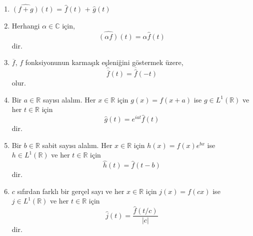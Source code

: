 \documentclass[a4paper, 9pt]{article}
\begin{document}
\begin{enumerate}
\item $\widehat{(f+g)}(t)$ = $\widehat{f}(t)$ + $\widehat{g}(t)$ 
\item Herhangi $\alpha \in \mathbb{C}$ için,
\[ \widehat{(\alpha f)}(t) = \alpha \widehat{f}(t) \]
dir.
\item  $\overline{f}$, $f$ fonksiyonunun karmaşık eşleniğini göstermek üzere,
\[ \widehat{\overline{f}}(t) = \overline{\widehat{f}}(-t) \]
olur.
\item  Bir $a \in \mathbb{R}$  sayısı alalım. Her $x\in \mathbb{R}$  için $g(x)=f(x+a)$ ise $g\in L^1(\mathbb{R})$ ve her $t\in \mathbb{R}$ için 
\[ \widehat{g}(t) = e^{iat}\widehat{f}(t)\]
dir.
\item Bir $b\in \mathbb{R}$ sabit sayısı alalım. Her $x\in \mathbb{R}$ için $h(x)=f(x)e^{bx}$ ise $h\in L^1(\mathbb{R})$ ve her $t\in \mathbb{R}$ için
\[ \widehat{h}(t) = \widehat{f}(t-b) \]
dir.
\item $c$ sıfırdan farklı bir gerçel sayı ve her $x \in \mathbb{R}$ için $j(x)=f(cx)$ ise $j\in L^1(\mathbb{R})$ ve her $t\in \mathbb{R}$ için
\[ \widehat{j}(t)=\frac{\widehat{f}(t/c)}{\left |  c \right |} \] dir.

\end{enumerate}
\end{document}

